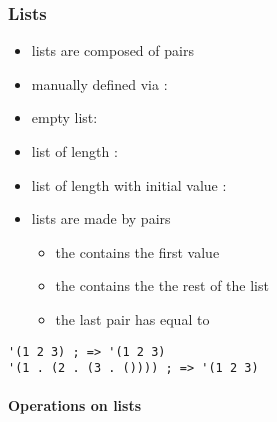 \documentclass[a4paper,landscape,10pt]{article}
\begin{document}
\begin{multicols*}{2}
  \subsubsection{Lists}

  \begin{itemize}
    \item lists are composed of pairs
    \item manually defined via : 
    \item empty list: 
    \item list of length : 
    \item list of length  with initial value : 
    \item lists are made by pairs
          \begin{itemize} \item the  contains the first value
            \item the  contains the the rest of the list
            \item the last pair has  equal to 
          \end{itemize}
  \end{itemize}

  \begin{lstlisting}[language=Racket]
'(1 2 3) ; => '(1 2 3)
'(1 . (2 . (3 . ()))) ; => '(1 2 3)
\end{lstlisting}

  \paragraph{Operations on lists}


\end{multicols*}
\end{document}
